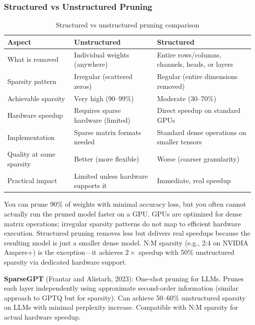 \subsubsection{Structured vs Unstructured Pruning}

\begin{table}[H]
\centering
\caption{Structured vs unstructured pruning comparison}
\begin{tabularx}{\textwidth}{lXX}
\toprule
\textbf{Aspect} & \textbf{Unstructured} & \textbf{Structured} \\
\midrule
What is removed & Individual weights (anywhere) & Entire rows/columns, channels, heads, or layers \\
Sparsity pattern & Irregular (scattered zeros) & Regular (entire dimensions removed) \\
Achievable sparsity & Very high (90--99\%) & Moderate (30--70\%) \\
Hardware speedup & Requires sparse hardware (limited) & Direct speedup on standard GPUs \\
Implementation & Sparse matrix formats needed & Standard dense operations on smaller tensors \\
Quality at same sparsity & Better (more flexible) & Worse (coarser granularity) \\
Practical impact & Limited unless hardware supports it & Immediate, real speedup \\
\bottomrule
\end{tabularx}
\end{table}

\begin{keyinsight}
You can prune 90\% of weights with minimal accuracy loss, but you often cannot actually run the pruned model faster on a GPU. GPUs are optimized for dense matrix operations; irregular sparsity patterns do not map to efficient hardware execution. Structured pruning removes less but delivers real speedups because the resulting model is just a smaller dense model. N:M sparsity (e.g., 2:4 on NVIDIA Ampere+) is the exception---it achieves $2\times$ speedup with 50\% unstructured sparsity via dedicated hardware support.
\end{keyinsight}

\textbf{SparseGPT} (Frantar and Alistarh, 2023): One-shot pruning for LLMs. Prunes each layer independently using approximate second-order information (similar approach to GPTQ but for sparsity). Can achieve 50--60\% unstructured sparsity on LLMs with minimal perplexity increase. Compatible with N:M sparsity for actual hardware speedup.


